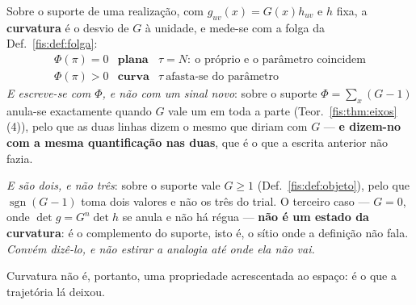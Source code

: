 \documentclass[livro.tex]{subfiles}
\begin{document}
\begin{definicao}\label{fis:def:curvatura}
Sobre o suporte de uma realização, com $g_{uv}(x)=G(x)h_{uv}$ e $h$ fixa, a
\textbf{curvatura} é o desvio de $G$ à unidade, e mede-se com a folga da
Def.~\ref{fis:def:folga}:
\[
\boxed{
\begin{array}{lll}
\Phi(\pi)=0 & \textbf{plana} & \tau=N:\ \text{o próprio e o parâmetro coincidem}\\
\Phi(\pi)>0 & \textbf{curva} & \tau\ \text{afasta-se do parâmetro}
\end{array}}
\]
\emph{E escreve-se com $\Phi$, e não com um sinal novo}: sobre o suporte
$\Phi=\sum_x(G-1)$ anula-se exactamente quando $G$ vale um em toda a parte
(Teor.~\ref{fis:thm:eixos}(4)), pelo que as duas linhas dizem o mesmo que diriam
com $G$ --- \textbf{e dizem-no com a mesma quantificação nas duas}, que é o que a
escrita anterior não fazia.

\emph{E são dois, e não três}: sobre o suporte vale $G\ge1$
(Def.~\ref{fis:def:objeto}), pelo que $\operatorname{sgn}(G-1)$ toma dois valores
e não os três do trial. O terceiro caso --- $G=0$, onde $\det g=G^{n}\det h$ se
anula e não há régua --- \textbf{não é um estado da curvatura}: é o complemento
do suporte, isto é, o sítio onde a definição não fala. \emph{Convém dizê-lo, e
não estirar a analogia até onde ela não vai.}

\medskip\noindent Curvatura não é, portanto, uma propriedade acrescentada ao
espaço: é o que a trajetória lá deixou.
\end{definicao}
\end{document}
